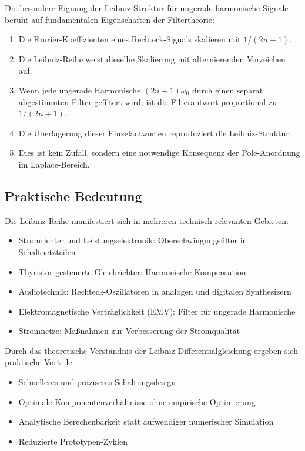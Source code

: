 \documentclass[a4paper,12pt,twoside]{report}
\theoremstyle{definition}
\begin{document}
Die besondere Eignung der Leibniz-Struktur für ungerade harmonische Signale beruht auf fundamentalen Eigenschaften der Filtertheorie:

\begin{enumerate}
	\item Die Fourier-Koeffizienten eines Rechteck-Signals skalieren mit $1/(2n+1)$.
	
	\item Die Leibniz-Reihe weist dieselbe Skalierung mit alternierenden Vorzeichen auf.
	
	\item Wenn jede ungerade Harmonische $(2n+1)\omega_0$ durch einen separat abgestimmten Filter gefiltert wird, ist die Filterantwort proportional zu $1/(2n+1)$.
	
	\item Die Überlagerung dieser Einzelantworten reproduziert die Leibniz-Struktur.
	
	\item Dies ist kein Zufall, sondern eine notwendige Konsequenz der Pole-Anordnung im Laplace-Bereich.
\end{enumerate}

\subsection{Praktische Bedeutung}

Die Leibniz-Reihe manifestiert sich in mehreren technisch relevanten Gebieten:

\begin{itemize}
	\item Stromrichter und Leistungselektronik: Oberschwingungsfilter in Schaltnetzteilen
	\item Thyristor-gesteuerte Gleichrichter: Harmonische Kompensation
	\item Audiotechnik: Rechteck-Oszillatoren in analogen und digitalen Synthesizern
	\item Elektromagnetische Verträglichkeit (EMV): Filter für ungerade Harmonische
	\item Stromnetze: Maßnahmen zur Verbesserung der Stromqualität
\end{itemize}

Durch das theoretische Verständnis der Leibniz-Differentialgleichung ergeben sich praktische Vorteile:

\begin{itemize}
	\item Schnelleres und präziseres Schaltungsdesign
	\item Optimale Komponentenverhältnisse ohne empirische Optimierung
	\item Analytische Berechenbarkeit statt aufwendiger numerischer Simulation
	\item Reduzierte Prototypen-Zyklen
\end{itemize}
\end{document}
